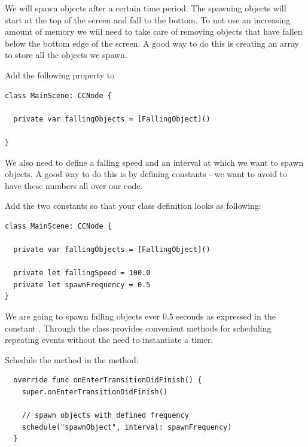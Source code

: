 We will spawn objects after a certain time period. The spawning objects will
start at the top of the screen and fall to the bottom. To not use an
increasing amount of memory we will need to take care of removing objects that
have fallen below the bottom edge of the screen. A good way to do this is
creating an array to store all the objects we spawn.

\begin{leftbar}
Add the following property to 
\begin{lstlisting}
class MainScene: CCNode {

  private var fallingObjects = [FallingObject]()

}
\end{lstlisting}
\end{leftbar}

We also need to define a falling speed and an interval at which we want to spawn
objects. A good way to do this is by defining constants - we want to avoid to
have these numbers all over our code. 

\begin{leftbar}
Add the two constants so that your class definition looks as following:

\begin{lstlisting}
class MainScene: CCNode {

  private var fallingObjects = [FallingObject]()

  private let fallingSpeed = 100.0
  private let spawnFrequency = 0.5
}
\end{lstlisting}
\end{leftbar}

We are going to spawn falling objects ever 0.5 seconds as expressed in
the constant . Through the  class
\cocos{} provides convenient methods for scheduling repeating events without the need to instantiate a timer. 

\begin{leftbar}
Schedule the  method in the
 method:

\begin{lstlisting}
  override func onEnterTransitionDidFinish() {
    super.onEnterTransitionDidFinish()
    
    // spawn objects with defined frequency
    schedule("spawnObject", interval: spawnFrequency)
  }
\end{lstlisting}
\end{leftbar}

